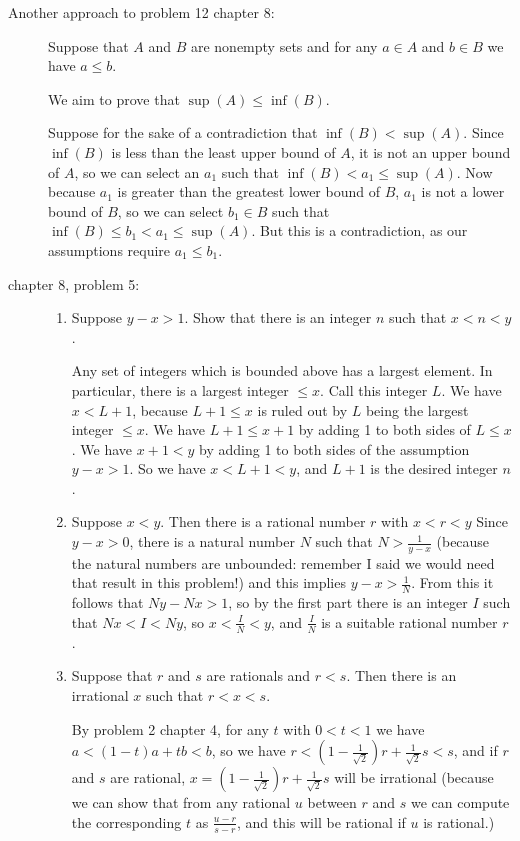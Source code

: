 \documentclass[12pt]{article}
\begin{document}
\begin{description}

\item[Another approach to problem 12 chapter 8:]  
Suppose that $A$ and $B$ are nonempty sets and for any $a \in A$ and $b \in B$ we have $a \leq b$.

We aim to prove that $\sup(A) \leq \inf(B)$.

Suppose for the sake of a contradiction that $\inf(B) < \sup(A)$.   Since $\inf(B)$ is less than the least upper bound of $A$, it is not an upper bound of $A$, so we can select an $a_1$
such that $\inf(B)<a_1 \leq \sup(A)$.  Now because $a_1$ is greater than the greatest lower bound of $B$, $a_1$ is not a lower bound of $B$, so we can select $b_1\in B$
such that $\inf(B) \leq b_1 < a_1 \leq \sup(A)$.  But this is a contradiction, as our assumptions require $a_1 \leq b_1$.

\item[chapter 8, problem 5:]

\begin{enumerate}

\item Suppose $y-x>1$.  Show that there is an integer $n$ such that $x<n<y$.

Any set of integers which is bounded above has a largest element.  In particular, there is a largest integer $\leq x$.  Call this integer $L$.  We have  $x < L+1$, because $L+1 \leq x$ is ruled
out by $L$ being the largest integer $\leq x$.  We have $L+1 \leq x+1$ by adding 1 to both sides of $L \leq x$.  We have $x+1 < y$ by adding 1 to both sides of the assumption $y-x>1$.  So we have
$x < L+1 <y$, and $L+1$ is the desired integer $n$.

\item  Suppose $x<y$.  Then there is a rational number $r$ with $x<r<y$
Since $y-x>0$, there is a natural number $N$ such that $N>\frac1{y-x}$ (because the natural numbers are unbounded:  remember I said we would need that result in this problem!) and this implies $y-x>\frac1N$.  From this it follows that $Ny-Nx>1$,
so by the first part there is an integer $I$ such that $Nx<I<Ny$, so $x < \frac IN <y$, and $\frac IN$ is a suitable rational number $r$.

\item  Suppose that $r$ and $s$ are rationals and $r<s$.  Then there is an irrational $x$ such that $r<x<s$.

By problem 2 chapter 4, for any $t$ with $0<t<1$ we have $a < (1-t)a+tb<b$, so we have $r < (1-\frac1{\sqrt 2})r + \frac1{\sqrt 2}s <s$, and if $r$ and $s$ are rational, $x=(1-\frac1{\sqrt 2})r + \frac1{\sqrt 2}s$
will be irrational (because we can show that from any rational $u$ between $r$ and $s$ we can compute the corresponding $t$ as $\frac{u-r}{s-r}$, and this will be rational if $u$ is rational.)


\end{enumerate}
\end{description}
\end{document}
